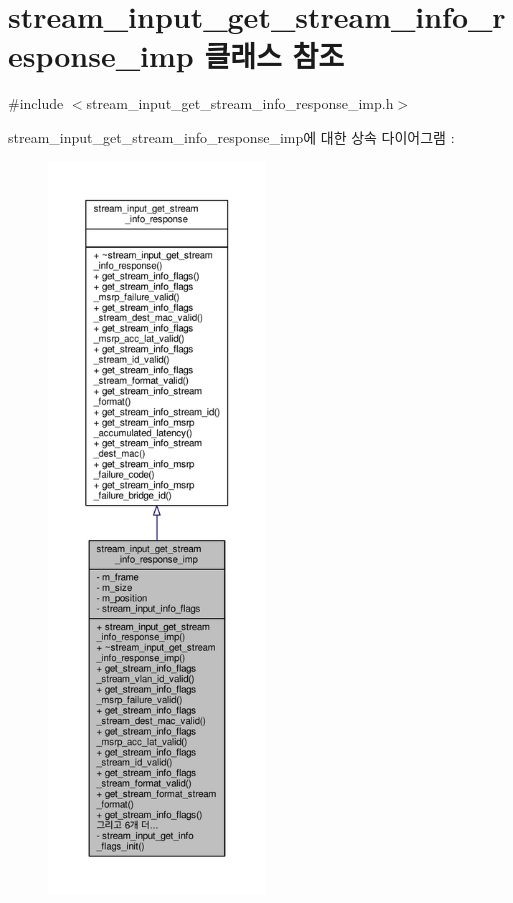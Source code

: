 \hypertarget{classavdecc__lib_1_1stream__input__get__stream__info__response__imp}{}\section{stream\+\_\+input\+\_\+get\+\_\+stream\+\_\+info\+\_\+response\+\_\+imp 클래스 참조}
\label{classavdecc__lib_1_1stream__input__get__stream__info__response__imp}


{\ttfamily \#include $<$stream\+\_\+input\+\_\+get\+\_\+stream\+\_\+info\+\_\+response\+\_\+imp.\+h$>$}



stream\+\_\+input\+\_\+get\+\_\+stream\+\_\+info\+\_\+response\+\_\+imp에 대한 상속 다이어그램 \+: 
\nopagebreak
\begin{figure}[H]
\begin{center}
\leavevmode
\includegraphics[height=550pt]{classavdecc__lib_1_1stream__input__get__stream__info__response__imp__inherit__graph}
\end{center}
\end{figure}


